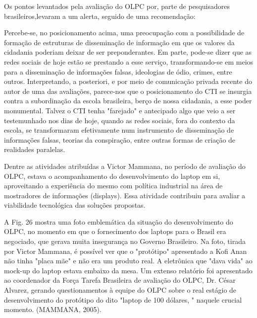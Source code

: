 Os pontos levantados pela avaliação do OLPC por, parte de pesquisadores brasileiros,levaram a um alerta, seguido de uma recomendação:


\noindent\begin{flushright}\mbox{\linespread{1}\selectfont\centering{}}\end{flushright}


Percebe-se, no posicionamento acima, uma preocupação com a possibilidade de formação de estruturas de disseminação de informação em que os valores da cidadania poderiam deixar de ser preponderantes. Em parte, pode-se dizer que as redes sociais de hoje estão se prestando a esse serviço, transformando-se em meios para a disseminação de informações falsas, ideologias de ódio, crimes, entre outros. Interpretando, a posteriori, e por meio de comunicação privada recente do autor de uma das avaliações, parece-nos que o posicionamento do CTI se insurgia contra a subordinação da escola brasileira, berço de nossa cidadania, a esse poder monumental. Talvez o CTI tenha "farejado" e antecipado algo que veio a ser testemunhado nos dias de hoje, quando as redes sociais, fora do contexto da escola, se transformaram efetivamente num instrumento de disseminação de informações falsas, teorias da conspiração, entre outras formas de criação de realidades paralelas.

Dentre as atividades atribuídas a Victor Mammana, no período de avaliação do OLPC, estava o acompanhamento do desenvolvimento do laptop em si, aproveitando a experiência do mesmo com política industrial na área de mostradores de informações (displays). Essa atividade contribuiu para avaliar a viabilidade tecnológica das soluções propostas.

A Fig. 26 mostra uma foto emblemática da situação do desenvolvimento do OLPC, no momento em que o fornecimento dos laptops para o Brasil era negociado, que gerava muita insegurança no Governo Brasileiro. Na foto, tirada por Victor Mammana, é possível ver que o "protótipo" apresentado a Kofi Anan não tinha "placa mãe" e não era um produto real. A eletrônica que "dava vida" ao mock-up do laptop estava embaixo da mesa. Um extenso relatório foi apresentado ao coordenador da Força Tarefa Brasileira de avaliação do OLPC, Dr. César Alvarez, gerando questionamentos à equipe do OLPC sobre o real estágio de desenvolvimento do protótipo do dito "laptop de 100 dólares, " naquele crucial momento. (MAMMANA, 2005).



